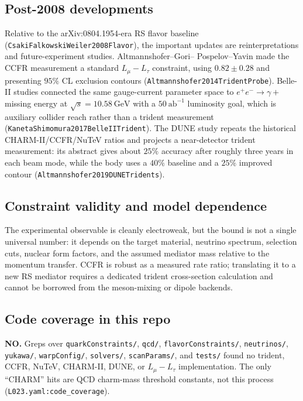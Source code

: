 \subsection*{Post-2008 developments}
Relative to the arXiv:0804.1954-era RS flavor baseline
(\texttt{CsakiFalkowskiWeiler2008Flavor}), the important updates are
reinterpretations and future-experiment studies.  Altmannshofer--Gori--
Pospelov--Yavin made the CCFR measurement a standard \(L_\mu-L_\tau\)
constraint, using \(0.82\pm0.28\) and presenting \(95\%\) CL exclusion contours
(\texttt{Altmannshofer2014TridentProbe}).  Belle-II studies connected the same
gauge-current parameter space to \(e^+e^-\to\gamma+\) missing energy at
\(\sqrt{s}=10.58~\mathrm{GeV}\) with a \(50~\mathrm{ab}^{-1}\) luminosity goal,
which is auxiliary collider reach rather than a trident measurement
(\texttt{KanetaShimomura2017BelleIITrident}).  The DUNE study repeats the
historical CHARM-II/CCFR/NuTeV ratios and projects a near-detector trident
measurement: its abstract gives about \(25\%\) accuracy after roughly three
years in each beam mode, while the body uses a \(40\%\) baseline and a
\(25\%\) improved contour (\texttt{Altmannshofer2019DUNETridents}).

\subsection*{Constraint validity and model dependence}
The experimental observable is cleanly electroweak, but the bound is not a
single universal number: it depends on the target material, neutrino spectrum,
selection cuts, nuclear form factors, and the assumed mediator mass relative to
the momentum transfer.  CCFR is robust as a measured rate ratio; translating it
to a new RS mediator requires a dedicated trident cross-section calculation and
cannot be borrowed from the meson-mixing or dipole backends.

\subsection*{Code coverage in this repo}
\textbf{NO.}  Greps over \texttt{quarkConstraints/}, \texttt{qcd/},
\texttt{flavorConstraints/}, \texttt{neutrinos/}, \texttt{yukawa/},
\texttt{warpConfig/}, \texttt{solvers/}, \texttt{scanParams/}, and
\texttt{tests/} found no trident, CCFR, NuTeV, CHARM-II, DUNE, or
\(L_\mu-L_\tau\) implementation.  The only ``CHARM'' hits are QCD charm-mass
threshold constants, not this process (\texttt{L023.yaml:code\_coverage}).

